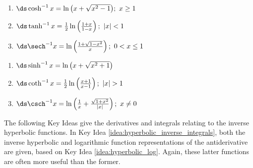 \setboxwidth{120pt}
\noindent\begin{minipage}{\specialboxlength}
{\noindent%
\begin{minipage}[t]{.5\specialboxlength}
\begin{enumerate}
\item $\ds\cosh^{-1}x=\ln\big(x+\sqrt{x^2-1}\big);\ x\geq1$\rule[-10pt]{0pt}{20pt}
\item $\ds\tanh^{-1}x = \frac12\ln\left(\frac{1+x}{1-x}\right);\ |x|<1$\rule[-10pt]{0pt}{20pt}
\item $\ds \sech^{-1}x = \ln\left(\frac{1+\sqrt{1-x^2}}x\right);\ 0<x\leq1$\rule[-10pt]{0pt}{20pt}
\end{enumerate}
\end{minipage}
\begin{minipage}[t]{.5\specialboxlength}
\begin{enumerate}\addtocounter{enumi}{3}
\item $\ds\sinh^{-1}x = \ln\big(x+\sqrt{x^2+1}\big)$\rule[-10pt]{0pt}{20pt}
\item	 $\ds\coth^{-1}x = \frac12\ln\left(\frac{x+1}{x-1}\right);\ |x|>1$\rule[-10pt]{0pt}{20pt}
\item $\ds\csch^{-1}x = \ln\left(\frac1x+\frac{\sqrt{1+x^2}}{|x|}\right);\ x\neq0$\rule[-10pt]{0pt}{20pt}
\end{enumerate}
\end{minipage}
}
\end{minipage}
\restoreboxwidth

The following Key Ideas give the derivatives and integrals relating to the inverse hyperbolic functions. In Key Idea \ref{idea:hyperbolic_inverse_integrals}, both the inverse hyperbolic and logarithmic function representations of the antiderivative are given, based on Key Idea \ref{idea:hyperbolic_log}. Again, these latter functions are often more useful than the former. 




